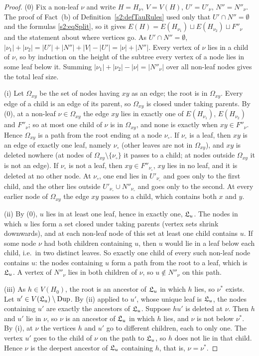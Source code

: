 \begin{proof}
(0) Fix a non-leaf $\nu$ and write $H=H_\nu$, $V=V(H)$, $U'=U'_\nu$,
$N''=N''_\nu$. The proof of Fact~(b) of Definition~\ref{s2:defTauRules} used
only that $U'\cap N''=\emptyset$ and the formulas \eqref{s2:eqSplit}, so it
gives $E(H)=E(H_{\nu_1})\sqcup E(H_{\nu_2})\sqcup F''_\nu$ and the statement
about where vertices go. As $U'\cap N''=\emptyset$,
$|\nu_1|+|\nu_2|=|U'|+|N''|+|V|-|U'|=|\nu|+|N''|$. Every vertex of $\nu$ lies
in a child of $\nu$, so by induction on the height of the subtree every vertex
of a node lies in some leaf below it. Summing $|\nu_1|+|\nu_2|-|\nu|=|N''_\nu|$
over all non-leaf nodes gives the total leaf size.

(i) Let $\Omega_{xy}$ be the set of nodes having $xy$ as an edge; the root is in $\Omega_{xy}$.
Every edge of a child is an edge of its parent, so $\Omega_{xy}$ is closed under taking
parents. By (0), at a non-leaf $\nu\in\Omega_{xy}$ the edge $xy$ lies in exactly one of
$E(H_{\nu_1})$, $E(H_{\nu_2})$ and $F''_\nu$; so at most one child of $\nu$ is
in $\Omega_{xy}$, and none is exactly when $xy\in F''_\nu$. Hence $\Omega_{xy}$ is a path from the
root ending at a node $\nu_\circ$. If $\nu_\circ$ is a leaf, then $xy$ is an
edge of exactly one leaf, namely $\nu_\circ$ (other leaves are not in $\Omega_{xy}$), and
$xy$ is deleted nowhere (at nodes of $\Omega_{xy}\setminus\{\nu_\circ\}$ it passes to a
child; at nodes outside $\Omega_{xy}$ it is not an edge). If $\nu_\circ$ is not a leaf,
then $xy\in F''_{\nu_\circ}$, $xy$ lies in no leaf, and it is deleted at no
other node. At $\nu_\circ$, one end lies in $U'_{\nu_\circ}$ and goes only to
the first child, and the other lies outside $U'_{\nu_\circ}\cup
N''_{\nu_\circ}$ and goes only to the second. At every earlier node of $\Omega_{xy}$ the
edge $xy$ passes to a child, which contains both $x$ and $y$.

(ii) By (0), $u$ lies in at least one leaf, hence in exactly one, $\mathfrak{L}_u$.
The nodes in which $u$ lies form a set closed under taking parents (vertex sets
shrink downwards), and at each non-leaf node of this set at least one child
contains $u$. If some node $\nu$ had both children containing $u$, then $u$
would lie in a leaf below each child, i.e.\ in two distinct leaves. So exactly
one child of every such non-leaf node contains $u$: the nodes containing $u$
form a path from the root to a leaf, which is $\mathfrak{L}_u$. A vertex of
$N''_\nu$ lies in both children of $\nu$, so $u\notin N''_\nu$ on this path.

(iii) As $h\in V(H_0)$, the root is an ancestor of $\mathfrak{L}_u$ in which $h$
lies, so $\nu^*$ exists. Let $u'\in V(\mathfrak{L}_u)\setminus\mathrm{Dup}$. By (ii) applied to $u'$, whose
unique leaf is $\mathfrak{L}_u$, the nodes containing $u'$ are exactly the ancestors
of $\mathfrak{L}_u$. Suppose $hu'$ is deleted at $\nu$. Then $h$ and $u'$ lie in
$\nu$, so $\nu$ is an ancestor of $\mathfrak{L}_u$ in which $h$ lies, and $\nu$ is
not below $\nu^*$. By (i), at $\nu$ the vertices $h$ and $u'$ go to different
children, each to only one. The vertex $u'$ goes to the child of $\nu$ on the
path to $\mathfrak{L}_u$, so $h$ does not lie in that child. Hence $\nu$ is the
deepest ancestor of $\mathfrak{L}_u$ containing $h$, that is, $\nu=\nu^*$.
\end{proof}

